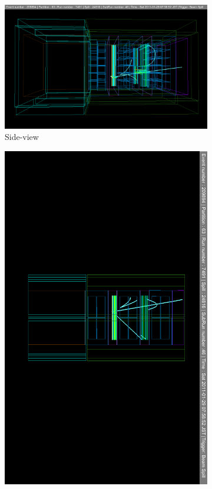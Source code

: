 \begin{figure}[htbp]
	\begin{subfigure}[t]{0.49\textwidth}
		\includegraphics[width=\textwidth, trim={1cm 3cm 1cm 1cm}, clip ]{figures/numu/evtdisplay/CCOthers_7491_46_209894_perX0Z_all}
		\caption{Side-view}
	\end{subfigure}
	\begin{subfigure}[t]{0.49\textwidth}
		\includegraphics[width=\textwidth, trim={3cm 16cm 3cm 16cm}, clip]{figures/numu/evtdisplay/CCOthers_7491_46_209894_ortX0Z_all}

\end{subfigure}
\end{figure}
